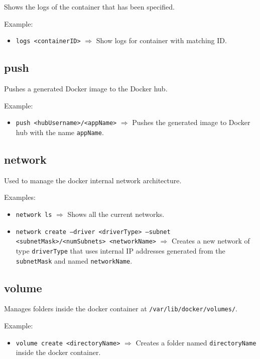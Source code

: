 \documentclass[a4paper, 12pt]{article}
\begin{document}
Shows the logs of the container that has been specified.

\vspace{0.5em}
Example:
\begin{itemize}
	\item \texttt{logs <containerID>} $\Rightarrow$ Show logs for container
	with matching ID.
\end{itemize}

\subsection{push}

Pushes a generated Docker image to the Docker hub.

\vspace{0.5em}
Example:
\begin{itemize}
	\item \texttt{push <hubUsername>/<appName>} $\Rightarrow$ Pushes the
	generated image to Docker hub with the name \texttt{appName}.
\end{itemize}

\subsection{network}

Used to manage the docker internal network architecture.

\vspace{0.5em}
Examples:
\begin{itemize}
	\item \texttt{network ls} $\Rightarrow$ Shows all the current networks.
	\item \texttt{network create --driver <driverType> --subnet
	<subnetMask>/<numSubnets> <networkName>} $\Rightarrow$ Creates a new network
	of type \texttt{driverType} that uses internal IP addresses generated from
	the \texttt{subnetMask} and named \texttt{networkName}.
\end{itemize}

\subsection{volume}

Manages folders inside the docker container at \verb|/var/lib/docker/volumes/|.

\vspace{0.5em}
Example:
\begin{itemize}
	\item \texttt{volume create <directoryName>} $\Rightarrow$ Creates a folder
	named \texttt{directoryName} inside the docker container.
\end{itemize}
\end{document}
